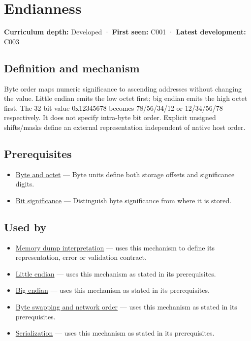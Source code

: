 \hypertarget{appendix-bc07c3d25b18}{}\label{referencestart:appendix-bc07c3d25b18}
\section{Endianness}\label{appendix-bc07c3d25b18-endianness}

\textbf{Curriculum depth:} Developed · \textbf{First seen:} C001 · \textbf{Latest development:} C003

\subsection{Definition and mechanism}\label{appendix-bc07c3d25b18-definition-and-mechanism}

Byte order maps numeric significance to ascending addresses without changing the value. Little endian emits the low octet first; big endian emits the high octet first. The 32-bit value 0x12345678 becomes 78/56/34/12 or 12/34/56/78 respectively. It does not specify intra-byte bit order. Explicit unsigned shifts/masks define an external representation independent of native host order.

\subsection{Prerequisites}\label{appendix-bc07c3d25b18-prerequisites}

\begin{itemize}
\tightlist
\item
  \hyperref[appendix-5bee2df85484]{Byte and octet} --- Byte units define both storage offsets and significance digits.
\item
  \hyperref[appendix-280445746493]{Bit significance} --- Distinguish byte significance from where it is stored.
\end{itemize}

\subsection{Used by}\label{appendix-bc07c3d25b18-used-by}

\begin{itemize}
\item
  \hyperref[appendix-230b59c0676b]{Memory dump interpretation} --- uses this mechanism to define its representation, error or validation contract.
\item
  \hyperref[appendix-367b6abf460e]{Little endian} --- uses this mechanism as stated in its prerequisites.
\item
  \hyperref[appendix-92e040df969a]{Big endian} --- uses this mechanism as stated in its prerequisites.
\item
  \hyperref[appendix-11ba36693aa2]{Byte swapping and network order} --- uses this mechanism as stated in its prerequisites.
\item
  \hyperref[appendix-91d09ebed979]{Serialization} --- uses this mechanism as stated in its prerequisites.
\end{itemize}

